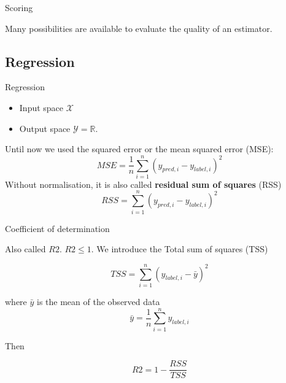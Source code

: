 \documentclass[usenames,dvipsnames,french]{beamer}
\begin{document}
\frame{\titlepage}


\begin{frame}{Scoring}

    Many possibilities are available to evaluate the quality of an estimator.
    
\end{frame}

\subsection{Regression}%
\label{sub:regression}


\begin{frame}{Regression}

    \begin{itemize}
        \item Input space $ \mathcal{X}$
        \item Output space $ \mathcal{Y}  = \mathbb{R} $.
    \end{itemize}

    Until now we used the squared error or the mean squared error (MSE):
    \begin{equation}
        MSE = \frac{1}{n} \sum^{n}_{i=1} (y_{pred, i}-y_{label, i})^2
    \end{equation}
    Without normalisation, it is also called \textbf{{residual sum of squares}} (RSS)
    \begin{equation}
        RSS = \sum^{n}_{i=1} (y_{pred, i}-y_{label, i})^2
    \end{equation}
    
\end{frame}

\begin{frame}{Coefficient of determination}

        Also called $R2$.  $R2\leq 1$. We introduce the Total sum of squares (TSS)

    \begin{equation}
        TSS = \sum^{n}_{i=1} (y_{label, i}- \bar{y})^2
    \end{equation}

    where $ \bar{y}$ is the mean of the observed data
    \begin{equation}
        \bar{y} = \frac{1}{n} \sum^{n}_{i=1} y_{label, i}
    \end{equation}
    
    Then

    \begin{equation}
        R2 = 1- \frac{RSS}{TSS} 
    \end{equation}
\end{frame}
\end{document}
